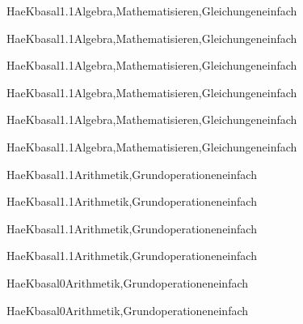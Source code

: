 \documentclass[12pt]{article}
\begin{document}
\begin{Add}{HaeK}{basal1.1}{Algebra,Mathematisieren,Gleichungen}{einfach}
\solution{ }
\end{Add}
\begin{Add}{HaeK}{basal1.1}{Algebra,Mathematisieren,Gleichungen}{einfach}
\end{Add}

\begin{Add}{HaeK}{basal1.1}{Algebra,Mathematisieren,Gleichungen}{einfach}
\solution{ }
\end{Add}
\begin{Add}{HaeK}{basal1.1}{Algebra,Mathematisieren,Gleichungen}{einfach}
\end{Add}

\begin{Add}{HaeK}{basal1.1}{Algebra,Mathematisieren,Gleichungen}{einfach}
\solution{ }
\end{Add}
\begin{Add}{HaeK}{basal1.1}{Algebra,Mathematisieren,Gleichungen}{einfach}
\end{Add}

\begin{Add}{HaeK}{basal1.1}{Arithmetik,Grundoperationen}{einfach}
\solution{ }
\end{Add}
\begin{Add}{HaeK}{basal1.1}{Arithmetik,Grundoperationen}{einfach}
\end{Add}

\begin{Add}{HaeK}{basal1.1}{Arithmetik,Grundoperationen}{einfach}
\solution{ }
\end{Add}
\begin{Add}{HaeK}{basal1.1}{Arithmetik,Grundoperationen}{einfach}
\end{Add}

\begin{Add}{HaeK}{basal0}{Arithmetik,Grundoperationen}{einfach}
\solution{ }
\end{Add}
\begin{Add}{HaeK}{basal0}{Arithmetik,Grundoperationen}{einfach}
\end{Add}
\end{document}
